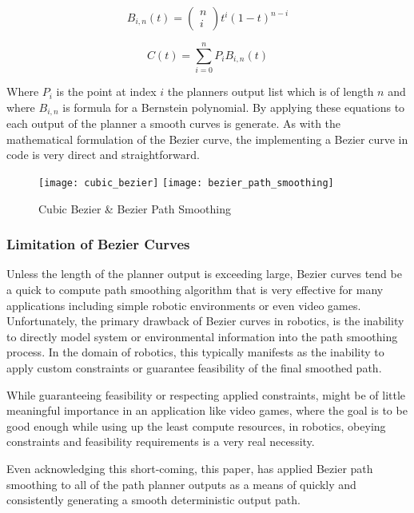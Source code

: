 \begin{equation}
    B_{i, n}(t)=\left(\begin{array}{c}
    n \\
    i
    \end{array}\right) t^i(1-t)^{n-i}
\end{equation}

\begin{equation}
    C(t)=\sum_{i=0}^n P_i B_{i, n}(t)
\end{equation}

Where $P_i$ is the point at index $i$ the planners output list which is of length $n$ and where $B_{i, n}$ is formula for a Bernstein polynomial. By applying these equations to each output of the planner a smooth curves is generate. As with the mathematical formulation of the Bezier curve, the implementing a Bezier curve in code is very direct and straightforward.

\begin{figure}[h]
    \texttt{[image: cubic\_bezier]}
    \texttt{[image: bezier\_path\_smoothing]}
    \centering
    \label{fig:bezier}
    \caption{Cubic Bezier \& Bezier Path Smoothing}
  \end{figure}

\subsubsection{Limitation of Bezier Curves}
Unless the length of the planner output is exceeding large, Bezier curves tend be a quick to compute path smoothing algorithm that is very effective for many applications including simple robotic environments or even video games. Unfortunately, the primary drawback of Bezier curves in robotics, is the inability to directly model system or environmental information into the path smoothing process. In the domain of robotics, this typically manifests as the inability to apply custom constraints or guarantee feasibility of the final smoothed path.  

While guaranteeing feasibility or respecting applied constraints, might be of little meaningful importance in an application like video games, where the goal is to be good enough while using up the least compute resources, in robotics, obeying constraints and feasibility requirements is a very real necessity.

Even acknowledging this short-coming, this paper, has applied Bezier path smoothing to all of the path planner outputs as a means of quickly and consistently generating a smooth deterministic output path.

